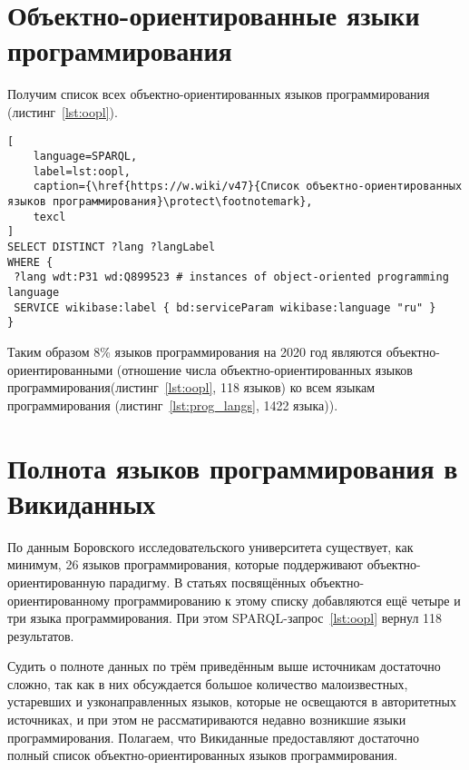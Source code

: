 \section{Объектно-ориентированные языки программирования}
Получим список всех объектно-ориентированных языков программирования (листинг~\ref{lst:oopl}).

\begin{lstlisting}[
	language=SPARQL,
	label=lst:oopl,
	caption={\href{https://w.wiki/v47}{Список объектно-ориентированных языков программирования}\protect\footnotemark},
	texcl
]
SELECT DISTINCT ?lang ?langLabel
WHERE {
 ?lang wdt:P31 wd:Q899523 # instances of object-oriented programming language
 SERVICE wikibase:label { bd:serviceParam wikibase:language "ru" }
}
\end{lstlisting}

Таким образом 8\% языков программирования на 2020 год являются объектно-ориентированными (отношение числа объектно-ориентированных языков программирования(листинг~\ref{lst:oopl}, 118 языков) ко всем языкам программирования (листинг~\ref{lst:prog_langs}, 1422 языка)).

\section{Полнота языков программирования в Викиданных}
По данным Боровского исследовательского университета\autocite{oo_langs_bourabai} существует, как минимум, 26 языков программирования, которые поддерживают объектно-ориентированную парадигму. В статьях посвящённых объектно-ориентированному программированию к этому списку добавляются ещё четыре\autocite{oo_langs_science_wikia} и три\autocite{oo_langs_garshin} языка программирования. При этом SPARQL-запрос~\ref{lst:oopl} вернул 118 результатов.

Судить о полноте данных по трём приведённым выше источникам достаточно сложно, так как в них обсуждается большое количество малоизвестных, устаревших и узконаправленных языков, которые не освещаются в авторитетных источниках, и при этом не рассматириваются недавно возникшие языки программирования. 
Полагаем, что Викиданные предоставляют достаточно полный список объектно-ориентированных языков программирования.

